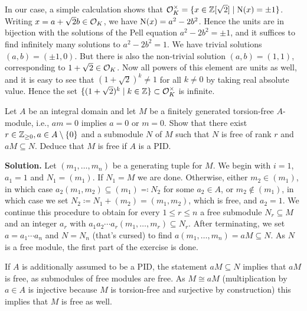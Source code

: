 \documentclass[a4paper,11pt]{article}
\begin{document}
In our case, a simple calculation shows that $\mathcal{O}_K^\times = \{x \in 
\mathbb{Z}[\sqrt 2] \mid \operatorname{N}(x) = \pm 1\}$. Writing $x = a + \sqrt 2 b \in \mathcal{O}_K$, we have
$\operatorname{N}(x) = a^2 - 2b^2$. Hence the units are in bijection with the solutions of
the Pell equation $a^2 - 2b^2 = \pm 1$, and it suffices to find infinitely many 
solutions to $a^2 - 2b^2 = 1$. We have trivial solutions $(a,b) = (\pm 1, 0)$.
But there is also the non-trivial solution $(a,b) = (1,1)$, corresponding to
$1 + \sqrt 2 \in \mathcal{O}_K$. Now all powers of this element are units as well, 
and it is easy to see that $(1 + \sqrt 2)^k \neq 
1$ for all $k \neq 0$ by taking real absolute value. Hence  the 
set $\{(1+\sqrt 2)^k \mid k \in \mathbb{Z}\} \subset \mathcal{O}_K^\times$ is infinite.


Let $A$ be an integral domain and let $M$ be a finitely generated torsion-free
$A$-module, i.e., $am = 0$ implies $a = 0$ or $m = 0$. Show that there exist $r
\in \mathbb{Z}_{\geq 0}, a \in A\setminus \{0\}$ and a submodule $N$ of $M$ such that
$N$ is free of rank $r$ and $aM \subseteq N$. Deduce that $M$ is free if $A$ is
a PID.

\textbf{Solution.} Let $(m_1, \dots, m_n)$ be a generating tuple for $M$. We begin
with $i = 1$, $a_1 = 1$ and $N_1 = (m_1)$. If $N_1 = M$ we are done.
Otherwise, either $m_2 \in (m_1)$, in which
case $a_2(m_1, m_2) \subseteq (m_1) \eqqcolon N_2$ for some $a_2 \in A$, or $m_2
\not \in (m_1)$, in which case we set $N_2 \coloneqq N_1 + (m_2) = (m_1, m_2)$, which
is free, and $a_2 = 1$. We continue this procedure to obtain
for every $1 \leq r \leq n$ a free submodule $N_r \subseteq M$ and an integer $a_r$
with $a_1a_2 \cdots a_r (m_1, \dots, m_r) \subseteq N_r$. After terminating, we set 
$a = a_1 \cdots a_n$ and $N = N_n$ (that's cursed) to find $a(m_1,
\dots, m_n) = aM \subseteq N$. As $N$ is a free module, the first part of the
exercise is done. 

If $A$ is additionally assumed to be a PID, the statement $aM \subseteq N$
implies that $aM$ is free, as submodules of free modules are free. As $M \cong
aM$ (multiplication by $a \in A$ is injective because $M$ is torsion-free and
surjective by construction) this implies that $M$ is free as well.


\contactend
\end{document}
